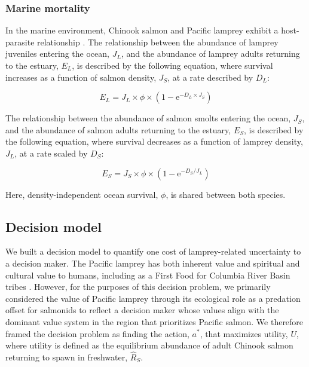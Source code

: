 \documentclass{article}
\begin{document}
\subsubsection*{Marine mortality}

In the marine environment, Chinook salmon and Pacific lamprey exhibit a host-parasite relationship \parencite{clemens2017conservation}. The relationship between the abundance of lamprey juveniles entering the ocean, $J_L$, and the abundance of lamprey adults returning to the estuary, $E_L$, is described by the following equation, where survival increases as a function of salmon density, $J_S$, at a rate described by $D_L$:

\begin{equation}
E_L = J_L \times \phi \times (1 - \text{e}^{-D_L \times J_S})
\end{equation}

The relationship between the abundance of salmon smolts entering the ocean, $J_S$, and the abundance of salmon adults returning to the estuary, $E_S$, is described by the following equation, where survival decreases as a function of lamprey density, $J_L$, at a rate scaled by $D_S$:

\begin{equation}
E_S = J_S \times \phi \times (1 - \text{e}^{-D_S/J_L})
\end{equation}

Here, density-independent ocean survival, $\phi$, is shared between both species.

\subsection*{Decision model}

We built a decision model to quantify one cost of lamprey-related uncertainty to a decision maker. The Pacific lamprey has both inherent value and spiritual and cultural value to humans, including as a First Food for Columbia River Basin tribes \parencite{close2002ecological, CRITFC_2011}. However, for the purposes of this decision problem, we primarily considered the value of Pacific lamprey through its ecological role as a predation offset for salmonids to reflect a decision maker whose values align with the dominant value system in the region that prioritizes Pacific salmon. We therefore framed the decision problem as finding the action, $a^*$, that maximizes utility, $U$, where utility is defined as the equilibrium abundance of adult Chinook salmon returning to spawn in freshwater, $\hat{R}_S$.
\end{document}
